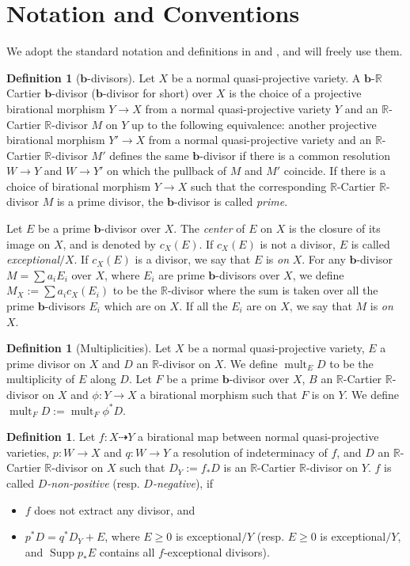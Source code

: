 \documentclass[11pt]{amsart}
\numberwithin{equation}{section}
\newcommand{\bb}{\bm{b}}
\newcommand{\Rr}{\mathbb{R}}
\newcommand{\Supp}{\operatorname{Supp}}
\newcommand{\mult}{\operatorname{mult}}
\theoremstyle{definition}
\newtheorem{defn}[thm]{Definition}
\theoremstyle{definition}
\theoremstyle{definition}
\begin{document}
\section{Notation and Conventions}

We adopt the standard notation and definitions in \cite{Sho92} and \cite{KM98}, and will freely use them.

\begin{defn}[$\bb$-divisors] Let $X$ be a normal quasi-projective variety. A $\bb$-$\Rr$ Cartier $\bb$-divisor ($\bb$-divisor for short) over $X$ is the choice of a projective birational morphism $Y\to X$ from a normal quasi-projective variety $Y$ and an $\Rr$-Cartier $\mathbb R$-divisor $M$ on $Y$ up to the following equivalence: another projective birational morphism $Y'\to X$ from a normal quasi-projective variety and an $\Rr$-Cartier $\Rr$-divisor $M'$ defines the same $\bb$-divisor if there is a common resolution $W\to Y$ and $W\to Y'$ on which the pullback of $M$ and $M'$ coincide. If there is a choice of birational morphism $Y\rightarrow X$ such that the corresponding $\Rr$-Cartier $\Rr$-divisor $M$ is a prime divisor, the $\bb$-divisor is called \emph{prime}.

	Let $E$ be a prime $\bb$-divisor over $X$. The \emph{center} of $E$ on $X$ is the closure of its image on $X$, and is denoted by $c_X(E)$. If $c_X(E)$ is not a divisor, $E$ is called \emph{exceptional}$/X$. If $c_X(E)$ is a divisor, we say that $E$ is \emph{on} $X$. For any $\bb$-divisor $M=\sum a_iE_i$ over $X$, where $E_i$ are prime $\bb$-divisors over $X$, we define $M_X:=\sum a_ic_X(E_i)$ to be the $\Rr$-divisor where the sum is taken over all the prime $\bb$-divisors $E_i$ which are on $X$. If all the $E_i$ are on $X$, we say that $M$ is \emph{on} $X$. 
\end{defn}

\begin{defn}[Multiplicities] Let $X$ be a normal quasi-projective variety, $E$ a prime divisor on $X$ and $D$ an $\Rr$-divisor on $X$. We define $\mult_ED$ to be the multiplicity of $E$ along $D$. 
Let $F$ be a prime $\bb$-divisor over $X$, $B$ an $\Rr$-Cartier $\Rr$-divisor on $X$ and $\phi: Y\to X$ a birational morphism such that $F$ is on $Y$. We define $\mult_FD:=\mult_F\phi^*D$.
\end{defn}


\begin{defn} Let $f: X\dashrightarrow Y$ a birational map between normal quasi-projective varieties, $p: W\rightarrow X$ and $q: W\rightarrow Y$ a resolution of indeterminacy of $f$, and $D$ an $\Rr$-Cartier $\Rr$-divisor on $X$ such that $D_Y:=f_*D$ is an $\Rr$-Cartier $\Rr$-divisor on $Y$. $f$ is called \emph{$D$-non-positive} (resp. \emph{$D$-negative}), if
\begin{itemize}
    \item $f$ does not extract any divisor, and
    \item $p^*D=q^*D_Y+E$, where $E\geq 0$ is exceptional$/Y$ (resp. $E\geq 0$ is exceptional$/Y$, and $\Supp p_*E$ contains all $f$-exceptional divisors). 
\end{itemize}
\end{defn}
\end{document}
